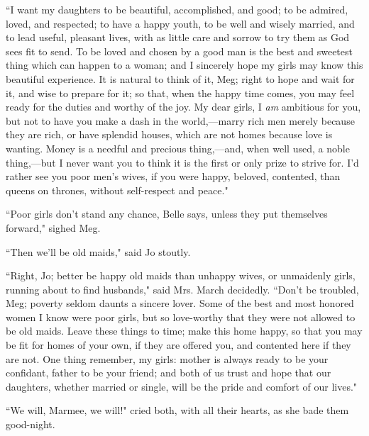 ``I want my daughters to be beautiful, accomplished, and good; to be
admired, loved, and respected; to have a happy youth, to be well and
wisely married, and to lead useful, pleasant lives, with as little care
and sorrow to try them as God sees fit to send. To be loved and chosen
by a good man is the best and sweetest thing which can happen to a
woman; and I sincerely hope my girls may know this beautiful experience.
It is natural to think of it, Meg; right to hope and wait for it, and
wise to prepare for it; so that, when the happy time comes, you may feel
ready for the duties and worthy of the joy. My dear girls, I \emph{am}
ambitious for you, but not to have you make a dash in the world,---marry
rich men merely because they are rich, or have splendid houses, which
are not homes because love is wanting. Money is a needful and precious
thing,---and, when well used, a noble thing,---but I never want you to
think it is the first or only prize to strive for. I'd
rather see you poor men's wives, if you were happy,
beloved, contented, than queens on thrones, without self-respect and
peace."

``Poor girls don't stand any chance, Belle says, unless
they put themselves forward," sighed Meg.

``Then we'll be old maids," said Jo stoutly.

``Right, Jo; better be happy old maids than unhappy wives, or unmaidenly
girls, running about to find husbands," said Mrs. March decidedly.
``Don't be troubled, Meg; poverty seldom daunts a sincere
lover. Some of the best and most honored women I know were poor girls,
but so love-worthy that they were not allowed to be old maids. Leave
these things to time; make this home happy, so that you may be fit for
homes of your own, if they are offered you, and contented here if they
are not. One thing remember, my girls: mother is always ready to be your
confidant, father to be your friend; and both of us trust and hope that
our daughters, whether married or single, will be the pride and comfort
of our lives."

``We will, Marmee, we will!" cried both, with all their hearts, as she
bade them good-night.

